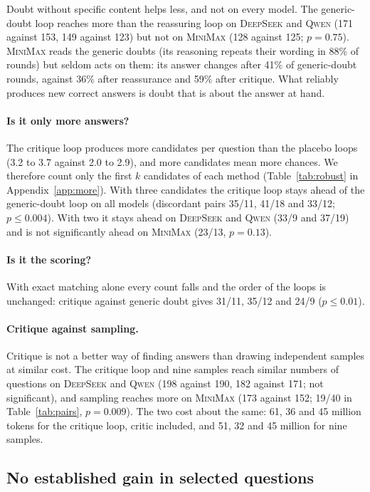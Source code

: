 \documentclass[11pt]{article}
\newcommand{\ds}{\textsc{DeepSeek}}
\newcommand{\qw}{\textsc{Qwen}}
\newcommand{\mm}{\textsc{MiniMax}}
\begin{document}
Doubt without specific content helps less, and not on every model.
The generic-doubt loop reaches more than the reassuring loop on \ds{} and \qw{} (171 against 153, 149 against 123) but not on \mm{} (128 against 125; $p=0.75$).
\mm{} reads the generic doubts (its reasoning repeats their wording in 88\% of rounds) but seldom acts on them: its answer changes after 41\% of generic-doubt rounds, against 36\% after reassurance and 59\% after critique.
What reliably produces new correct answers is doubt that is about the answer at hand.

\paragraph{Is it only more answers?}
The critique loop produces more candidates per question than the placebo loops (3.2 to 3.7 against 2.0 to 2.9), and more candidates mean more chances.
We therefore count only the first $k$ candidates of each method (Table~\ref{tab:robust} in Appendix~\ref{app:more}).
With three candidates the critique loop stays ahead of the generic-doubt loop on all models (discordant pairs 35/11, 41/18 and 33/12; $p\le 0.004$).
With two it stays ahead on \ds{} and \qw{} (33/9 and 37/19) and is not significantly ahead on \mm{} (23/13, $p=0.13$).

\paragraph{Is it the scoring?}
With exact matching alone every count falls and the order of the loops is unchanged: critique against generic doubt gives 31/11, 35/12 and 24/9 ($p\le 0.01$).

\paragraph{Critique against sampling.}
Critique is not a better way of finding answers than drawing independent samples at similar cost.
The critique loop and nine samples reach similar numbers of questions on \ds{} and \qw{} (198 against 190, 182 against 171; not significant), and sampling reaches more on \mm{} (173 against 152; 19/40 in Table~\ref{tab:pairs}, $p=0.009$).
The two cost about the same: 61, 36 and 45 million tokens for the critique loop, critic included, and 51, 32 and 45 million for nine samples.


\subsection{No established gain in selected questions}
\label{sec:select}
\end{document}
